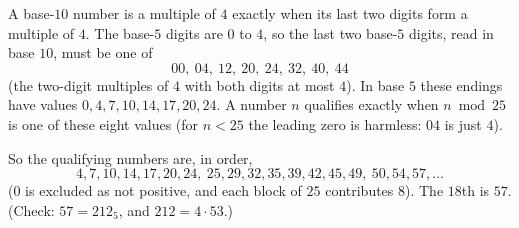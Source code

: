 A base-$10$ number is a multiple of $4$ exactly when its last two digits form a multiple of $4$. The base-$5$ digits are $0$ to $4$, so the last two base-$5$ digits, read in base $10$, must be one of
\[
00,\ 04,\ 12,\ 20,\ 24,\ 32,\ 40,\ 44
\]
(the two-digit multiples of $4$ with both digits at most $4$). In base $5$ these endings have values $0,4,7,10,14,17,20,24$. A number $n$ qualifies exactly when $n\bmod25$ is one of these eight values (for $n<25$ the leading zero is harmless: $04$ is just $4$).

So the qualifying numbers are, in order,
\[
4,7,10,14,17,20,24,\ 25,29,32,35,39,42,45,49,\ 50,54,57,\ldots
\]
($0$ is excluded as not positive, and each block of $25$ contributes $8$). The $18$th is $\boxed{57}$. (Check: $57=212_5$, and $212=4\cdot53$.)
